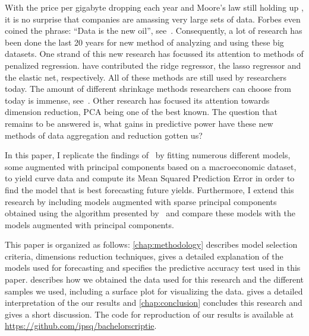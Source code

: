 With the price per gigabyte dropping each year and Moore's law still holding up \parencite{schaller_moores_1997}, it is no surprise that companies are amassing very large sets of data. 
Forbes even coined the phrase: \enquote{Data is the new oil}, see~\textcite{bhageshpur_council_2019}. 
Consequently, a lot of research has been done the last 20 years for new method of analyzing and using these big datasets. 
One strand of this new research has focussed its attention to methods of penalized regression. 
\Textcite{bell_solutions_1978,tibshirani_regression_1996,zou_regularization_2005} have contributed the ridge regressor, the lasso regressor and the elastic net, respectively. All of these methods are still used by researchers today. 
The amount of different shrinkage methods researchers can choose from today is immense, see~\textcite{bai_forecasting_2008,bai_boosting_2009,schumacher_factor_2010,stock_generalized_2012,kim_forecasting_2014,kim_mining_2018,hirano_forecasting_2017}. 
Other research has focused its attention towards dimension reduction, PCA being one of the best known. 
The question that remains to be answered is, what gains in predictive power have these new methods of data aggregation and reduction gotten us? 

In this paper, I replicate the findings of~\textcite{swanson_big_2017} by fitting numerous different models, some augmented with principal components based on a macroeconomic dataset, to yield curve data and compute its Mean Squared Prediction Error in order to find the model that is best forecasting future yields. 
Furthermore, I extend this research by including models augmented with sparse principal components obtained using the algorithm presented by~\textcite{zou_sparse_2006} and compare these models with the models augmented with principal components. 

This paper is organized as follows: \cref{chap:methodology} describes model selection criteria, dimensions reduction techniques, gives a detailed explanation of the models used for forecasting and specifies the predictive accuracy test used in this paper. 
 describes how we obtained the data used for this research and the different samples we used, including a surface plot for visualizing the data. 
 gives a detailed interpretation of the our results and \cref{chap:conclusion} concludes this research and gives a short discussion. 
The code for reproduction of our results is available at \url{https://github.com/ipsq/bachelorscriptie}. 
